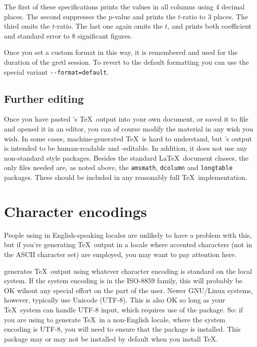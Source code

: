 The first of these specifications prints the values in all columns
using 4 decimal places.  The second suppresses the p-value and prints
the $t$-ratio to 3 places.  The third omits the $t$-ratio.  The last
one again omits the $t$, and prints both coefficient and standard
error to 8 significant figures.

Once you set a custom format in this way, it is remembered and used
for the duration of the gretl session.  To revert to the default
formatting you can use the special variant \verb|--format=default|.


\subsection{Further editing}

Once you have pasted 's \TeX\ output into your own
document, or saved it to file and opened it in an editor, you can of
course modify the material in any wish you wish.  In some cases,
machine-generated \TeX\ is hard to understand, but 's
output is intended to be human-readable and -editable.  In addition,
it does not use any non-standard style packages.  Besides the standard
\LaTeX\ document classes, the only files needed are, as noted above,
the \verb+amsmath+, \verb+dcolumn+ and \verb+longtable+ packages.
These should be included in any reasonably full \TeX\ implementation.


\section{Character encodings}
\label{tex-encode}

People using  in English-speaking locales are unlikely to
have a problem with this, but if you're generating \TeX\ output in a
locale where accented characters (not in the ASCII character set) are
employed, you may want to pay attention here.

 generates \TeX\ output using whatever character encoding
is standard on the local system.  If the system encoding is in the
ISO-8859 family, this will probably be OK wihout any special effort on
the part of the user.  Newer GNU/Linux systems, however, typically use
Unicode (UTF-8).  This is also OK so long as your \TeX\ system can
handle UTF-8 input, which requires use of the  package.
So: if you are using  to generate \TeX\ in a non-English
locale, where the system encoding is UTF-8, you will need to ensure
that the  package is installed.  This package may or
may not be installed by default when you install \TeX{}.

